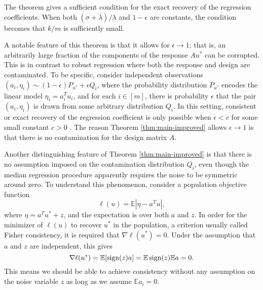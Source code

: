 The theorem gives a sufficient condition for the exact recovery of the regression coefficients. When both $(\sigma+\overline{\lambda})/\underline{\lambda}$ and $1-\epsilon$ are constants, the condition becomes that $k/m$ is sufficiently small.

A notable feature of this theorem is that it allows for $\epsilon \rightarrow 1$; that is, an arbitrarily large fraction of the components of the response $Au^*$ can be corrupted. This is in contrast to robust regression where both the response and design are contaminated. To be specific, consider independent observations $(a_i,\eta_i)\sim (1-\epsilon)P_{u^*}+\epsilon Q_i$, where the probability distribution $P_{u^*}$ encodes the linear model $\eta_i=a_i^Tu_i$, and for each $i\in[m]$, there is probability $\epsilon$ that the pair $(a_i,\eta_i)$ is drawn from some arbitrary distribution $Q_i$. In this setting, consistent or exact recovery of the regression coefficient is only possible when $\epsilon<c$ for some small constant $c>0$ \citep{gao2020}. The reason Theorem \ref{thm:main-improved} allows $\epsilon\rightarrow 1$ is that there is no contamination for the design matrix $A$.


Another distinguishing feature of Theorem \ref{thm:main-improved} is that there is no assumption imposed on the contamination distribution $Q_i$, even though the median regression procedure apparently requires the noise to be symmetric around zero. To understand this phenomenon, consider a population objective function
$$\ell(u)=\mathbb{E}|\eta - a^Tu|,$$
where $\eta=a^Tu^*+z$, and the expectation is over both $a$ and $z$. In order for the minimizer of $\ell(u)$ to recover $u^*$ in the population, a criterion usually called Fisher consistency, it is required that $\nabla\ell(u^*)=0$. Under the assumption that $a$ and $z$ are independent, this gives
\begin{equation}
\nabla\ell(u^*)=\mathbb{E}[\sgn(z)a]=\mathbb{E}\sgn(z)\mathbb{E}a=0. \label{eq:pop-insight}
\end{equation}
This means we should be able to achieve consistency without any assumption on the noise variable $z$ as long as we assume $\mathbb{E}a_i=0$.

